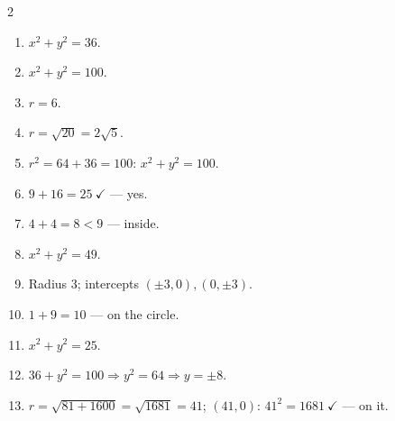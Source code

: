 \documentclass[11pt]{article}
\begin{document}
\begin{keybox}
\begin{multicols}{2}
\small
\begin{enumerate}[leftmargin=*,itemsep=3pt]
  \item $x^2+y^2=36$.
  \item $x^2+y^2=100$.
  \item $r=6$.
  \item $r=\sqrt{20}=2\sqrt5$.
  \item $r^2=64+36=100$: $x^2+y^2=100$.
  \item $9+16=25\ \checkmark$ --- yes.
  \item $4+4=8<9$ --- inside.
  \item $x^2+y^2=49$.
  \item Radius $3$; intercepts $(\pm3,0),(0,\pm3)$.
  \item $1+9=10$ --- on the circle.
  \item $x^2+y^2=25$.
  \item $36+y^2=100\Rightarrow y^2=64\Rightarrow y=\pm8$.
  \item $r=\sqrt{81+1600}=\sqrt{1681}=41$; $(41,0)$: $41^2=1681\ \checkmark$ --- on it.
\end{enumerate}
\end{multicols}
\end{keybox}
\end{document}
